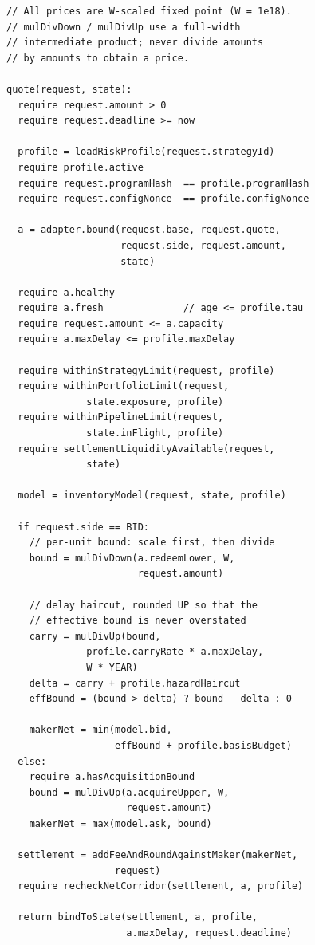\documentclass[10pt,twocolumn]{article}
\theoremstyle{definition}
\begin{document}
\vspace{-2pt}
{\scriptsize
\begin{verbatim}
// All prices are W-scaled fixed point (W = 1e18).
// mulDivDown / mulDivUp use a full-width
// intermediate product; never divide amounts
// by amounts to obtain a price.

quote(request, state):
  require request.amount > 0
  require request.deadline >= now

  profile = loadRiskProfile(request.strategyId)
  require profile.active
  require request.programHash  == profile.programHash
  require request.configNonce  == profile.configNonce

  a = adapter.bound(request.base, request.quote,
                    request.side, request.amount,
                    state)

  require a.healthy
  require a.fresh              // age <= profile.tau
  require request.amount <= a.capacity
  require a.maxDelay <= profile.maxDelay

  require withinStrategyLimit(request, profile)
  require withinPortfolioLimit(request,
              state.exposure, profile)
  require withinPipelineLimit(request,
              state.inFlight, profile)
  require settlementLiquidityAvailable(request,
              state)

  model = inventoryModel(request, state, profile)

  if request.side == BID:
    // per-unit bound: scale first, then divide
    bound = mulDivDown(a.redeemLower, W,
                       request.amount)

    // delay haircut, rounded UP so that the
    // effective bound is never overstated
    carry = mulDivUp(bound,
              profile.carryRate * a.maxDelay,
              W * YEAR)
    delta = carry + profile.hazardHaircut
    effBound = (bound > delta) ? bound - delta : 0

    makerNet = min(model.bid,
                   effBound + profile.basisBudget)
  else:
    require a.hasAcquisitionBound
    bound = mulDivUp(a.acquireUpper, W,
                     request.amount)
    makerNet = max(model.ask, bound)

  settlement = addFeeAndRoundAgainstMaker(makerNet,
                   request)
  require recheckNetCorridor(settlement, a, profile)

  return bindToState(settlement, a, profile,
                     a.maxDelay, request.deadline)
\end{verbatim}
}
\end{document}
